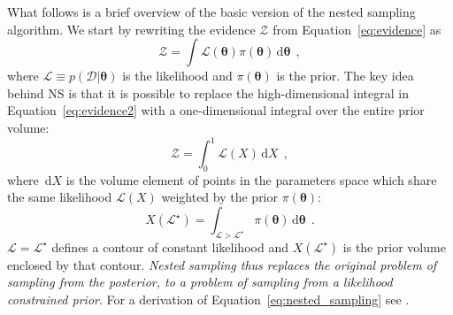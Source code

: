 \documentclass[12pt,dvipsnames]{report}
\newcommand{\ud}{\,\mathrm{d}}
\renewcommand{\vec}[1]{\boldsymbol{\mathbf{#1}}}
\newcommand{\hquad}{~~}
\begin{document}
What follows is a brief overview of the basic version of the nested sampling algorithm.
We start by rewriting the evidence $\mathcal{Z}$ from Equation~\ref{eq:evidence}
as 
\begin{equation}
\mathcal{Z}=\int \mathcal{L}(\vec\theta) \pi(\vec \theta)\ud\vec\theta
\hquad,
\label{eq:evidence2}
\end{equation}
where  $\mathcal{L}\equiv p(\mathcal{D}\lvert\vec \theta)$ is the likelihood 
and $\pi(\vec \theta)$ is the prior. The key idea behind NS is that it is possible 
to replace the high-dimensional integral in Equation~\ref{eq:evidence2} with 
a one-dimensional integral over the entire prior volume: 
\begin{equation}
    \mathcal{Z}=\int_{0}^{1} \mathcal{L}(X) \ud X
    \hquad,
    \label{eq:nested_sampling}
\end{equation}
where $\ud X$ is the volume element of points in the parameters space which 
share the same likelihood $\mathcal{L}(X)$ weighted by the prior $\pi(\vec\theta)$:
\begin{equation}
X\left(\mathcal{L}^{\star}\right)=\int_{\mathcal{L}>\mathcal{L}^{\star}} \pi(\vec\theta) \ud \vec\theta
\hquad.
\end{equation}
$\mathcal{L}=\mathcal{L}^\star$ defines a contour of constant likelihood and 
$X(\mathcal{L}^\star)$ is the prior volume enclosed by that contour.
\emph{Nested sampling thus replaces the original problem of sampling from the posterior, 
to a problem of sampling from a likelihood constrained prior}.
For a derivation of Equation~\ref{eq:nested_sampling} see \citet{arXiv:2205.15570}.
\end{document}
